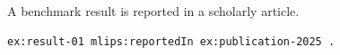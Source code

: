 A benchmark result is reported in a scholarly article.
\begin{lstlisting}[language=turtle]
ex:result-01 mlips:reportedIn ex:publication-2025 .
\end{lstlisting}
